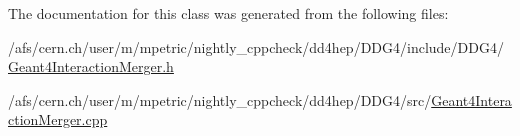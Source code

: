 The documentation for this class was generated from the following files:\begin{DoxyCompactItemize}
\item 
/afs/cern.ch/user/m/mpetric/nightly\_\-cppcheck/dd4hep/DDG4/include/DDG4/\hyperlink{_geant4_interaction_merger_8h}{Geant4InteractionMerger.h}\item 
/afs/cern.ch/user/m/mpetric/nightly\_\-cppcheck/dd4hep/DDG4/src/\hyperlink{_geant4_interaction_merger_8cpp}{Geant4InteractionMerger.cpp}\end{DoxyCompactItemize}
